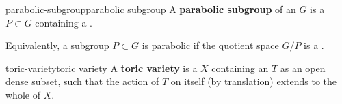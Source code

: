\begin{topic}{parabolic-subgroup}{parabolic subgroup}
    A \textbf{parabolic subgroup} of an  $G$ is a  $P \subset G$ containing a .
    
    Equivalently, a subgroup $P \subset G$ is parabolic if the quotient space $G/P$ is a .
\end{topic}

\begin{topic}{toric-variety}{toric variety}
    A \textbf{toric variety} is a  $X$ containing an  $T$ as an open dense subset, such that the action of $T$ on itself (by translation) extends to the whole of $X$.
\end{topic}

